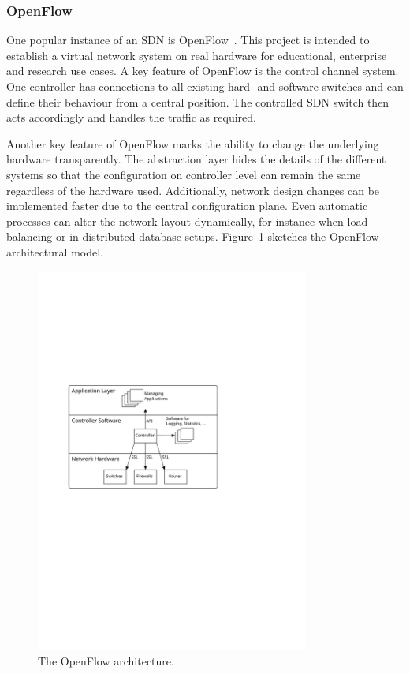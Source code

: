 \documentclass[a4paper,
		12pt,
		parskip=full,
		titlepage
		]{scrartcl}
\begin{document}
\subsubsection{OpenFlow}
One popular instance of an SDN is OpenFlow~\cite{openflow_spec10}.
This project is intended to establish a virtual network system on real hardware 
for educational, enterprise and research use cases.
A key feature of OpenFlow is the control channel system.
One controller has connections to all existing hard- and software switches and can define their behaviour from a central position.
The controlled SDN switch then acts accordingly and handles the traffic as required.

Another key feature of OpenFlow marks the ability to change the underlying hardware transparently.
The abstraction layer hides the details of the different systems so that 
the configuration on controller level can remain the same regardless of the hardware used.
Additionally, network design changes can be implemented faster due to the central configuration plane.
Even automatic processes can alter the network layout dynamically, for instance when load balancing 
or in distributed database setups.
Figure~\ref{fig:openflow-arch} sketches the  OpenFlow architectural model.

\begin{figure}
\centering
\includegraphics[width=0.8\textwidth]{images/openflow-arch}
\caption{The OpenFlow architecture.}
\label{fig:openflow-arch}
\end{figure}
\end{document}
